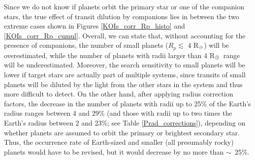 \documentclass[twocolumn,appendixfloats]{aastex6}
\newcommand{\RE}{R$_{\Earth}$}
\begin{document}
Since we do not know if planets orbit the primary star or one of the
companion stars, the true effect of transit dilution by companions lies
in between the two extreme cases shown in Figures \ref{KOIs_corr_Rp_histo}
and \ref{KOIs_corr_Rp_cumul}. Overall, we can state that, without accounting 
for the presence of companions, the number of small planets ($R_p \lesssim$ 
4 \RE) will be overestimated, while the number of planets with radii larger
than 4 \RE\ range will be underestimated. 
Moreover, the search sensitivity to small planets will be lower if target stars are
actually part of multiple systems, since transits of small planets will be diluted
by the light from the other stars in the system and thus more difficult to detect.
On the other hand, after applying radius correction factors, the decrease 
in the number of planets with radii up to 25\% of the Earth's radius ranges 
between 4 and 29\% (and those with radii up to two times the Earth's radius 
between 2 and 23\%; see Table \ref{Prad_corrections}), depending on whether
planets are assumed to orbit the primary or brightest secondary star. Thus,
the occurrence rate of Earth-sized and smaller (all presumably rocky) planets 
would have to be revised, but it would decrease by no more than $\sim$~25\%.
\end{document}
